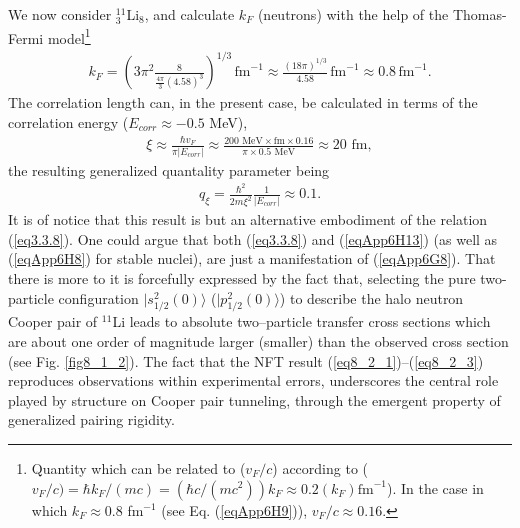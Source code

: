 \begin{subappendices}
We now consider $^{11}_3$Li$_8$, and calculate $k_F$ (neutrons) with the help of the Thomas-Fermi model\footnote{\label{fnC655} Quantity which can be related to ($v_F/c$) according to   ($v_F/c)=\hbar k_F/(mc)=(\hbar c/(mc^2))k_F\approx0.2(k_F)\text{fm}^{-1}$). In the case in which $k_F\approx 0.8 $ fm$^{-1}$ (see Eq. (\ref{eqApp6H9})),  $v_F/c\approx 0.16$. }
\begin{align}\label{eqApp6H9}
k_F=\left(3\pi^2\frac{8}{\frac{4\pi}{3}(4.58)^3}\right)^{1/3}\,\text{fm}^{-1}\approx\frac{(18\pi)^{1/3}}{4.58}\,\text{fm}^{-1}\approx 0.8\,\text{fm}^{-1}.
\end{align} 
The correlation length can, in the present case, be calculated in terms of the correlation energy ($E_{corr}\approx-0.5$ MeV), 
\begin{align}
\xi\approx \frac{\hbar v_F}{\pi|E_{corr}|}\approx \frac{200 \text{ MeV}\times\text{fm}\times0.16}{\pi\times 0.5\text{ MeV}}\approx 20\text{ fm},
\end{align}
 the resulting generalized quantality parameter being
\begin{align}\label{eqApp6H13}
q_\xi=\frac{\hbar^2}{2m\xi^2}\frac{1}{|E_{corr}|}\approx 0.1.
\end{align}
It is of notice that this result is but an alternative embodiment of the relation (\ref{eq3.3.8}). One could argue that both (\ref{eq3.3.8}) and (\ref{eqApp6H13}) (as well as (\ref{eqApp6H8}) for stable nuclei), are just a manifestation of (\ref{eqApp6G8}). That there is more to it is forcefully expressed by the fact that, selecting the pure two-particle configuration $|s_{1/2}^2(0)\rangle$ ($|p_{1/2}^2(0)\rangle$) to describe the halo neutron Cooper pair of $^{11}$Li leads to absolute two--particle transfer cross sections which are about one order of magnitude larger (smaller) than the observed cross section (see Fig. \ref{fig8_1_2}). The fact that the NFT result (\ref{eq8_2_1})--(\ref{eq8_2_3}) reproduces observations within experimental errors, underscores the central role played by structure on Cooper pair tunneling, through the emergent property of generalized pairing rigidity.




\end{subappendices}
